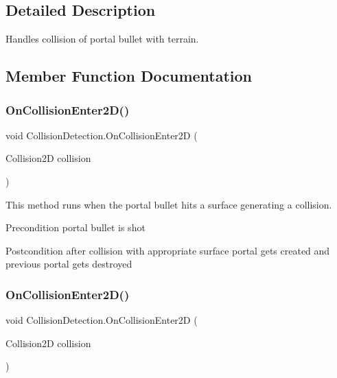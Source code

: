 \subsection{Detailed Description}
Handles collision of portal bullet with terrain. 

\subsection{Member Function Documentation}
\mbox{\label{class_collision_detection_ae5c7d4d990b3c888dc8866821a3d0366}} 
\subsubsection{\texorpdfstring{On\+Collision\+Enter2\+D()}{OnCollisionEnter2D()}\hspace{0.1cm}{\footnotesize\ttfamily [1/2]}}
{\footnotesize\ttfamily void Collision\+Detection.\+On\+Collision\+Enter2D (\begin{DoxyParamCaption}\item[{Collision2D}]{collision }\end{DoxyParamCaption})\hspace{0.3cm}{\ttfamily [inline]}}

This method runs when the portal bullet hits a surface generating a collision. \begin{DoxyPrecond}{Precondition}
portal bullet is shot 
\end{DoxyPrecond}
\begin{DoxyPostcond}{Postcondition}
after collision with appropriate surface portal gets created and previous portal gets destroyed 
\end{DoxyPostcond}
\mbox{\label{class_collision_detection_ae5c7d4d990b3c888dc8866821a3d0366}} 
\subsubsection{\texorpdfstring{On\+Collision\+Enter2\+D()}{OnCollisionEnter2D()}\hspace{0.1cm}{\footnotesize\ttfamily [2/2]}}
{\footnotesize\ttfamily void Collision\+Detection.\+On\+Collision\+Enter2D (\begin{DoxyParamCaption}\item[{Collision2D}]{collision }\end{DoxyParamCaption})\hspace{0.3cm}{\ttfamily [inline]}}

